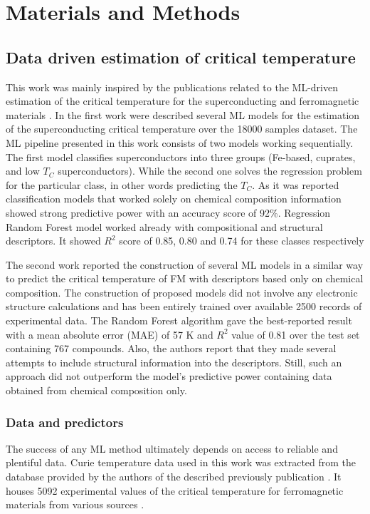 \chapter{Materials and Methods}
\section{Data driven estimation of critical temperature}

This work was mainly inspired by the publications related to the ML-driven estimation of the critical temperature for the superconducting  \cite{Stanev:2018uk} and ferromagnetic materials \cite{Nelson:2019ui}.
In the first work \cite{Stanev:2018uk} were described several ML models for the estimation of the superconducting critical temperature over the 18000 samples dataset. The ML pipeline presented in this work consists of two models working sequentially. The first model classifies superconductors into three groups (Fe-based, cuprates, and low $T_C$ superconductors). While the second one solves the regression problem for the particular class, in other words predicting the $T_C$.  As it was reported classification models that worked solely on chemical composition information showed strong predictive power with an accuracy score of 92\%. Regression Random Forest model worked already with compositional and structural descriptors. It showed $R^2$ score of 0.85, 0.80 and 0.74 for these classes respectively

The second work \cite{Nelson:2019ui} reported the construction of several ML models in a similar way to predict the critical temperature of FM with descriptors based only on chemical composition.  The construction of proposed models did not involve any electronic structure calculations and has been entirely trained over available 2500 records of experimental data. The Random Forest algorithm gave the best-reported result with a mean absolute error (MAE) of 57 K and $R^2$ value of 0.81 over the test set containing 767 compounds. 
Also, the authors report that they made several attempts to include structural information into the descriptors. Still, such an approach did not outperform the model's predictive power containing data obtained from chemical composition only.

\subsection{Data and predictors}
The success of any ML method ultimately depends on access to reliable and plentiful data. Curie temperature data used in this work was extracted from the database provided by the authors of the described previously publication \cite{Nelson:2019ui}.  It houses 5092 experimental values of the critical temperature for ferromagnetic materials from various sources \cite{Xu2011InorganicMD,  osti_4549319}.

